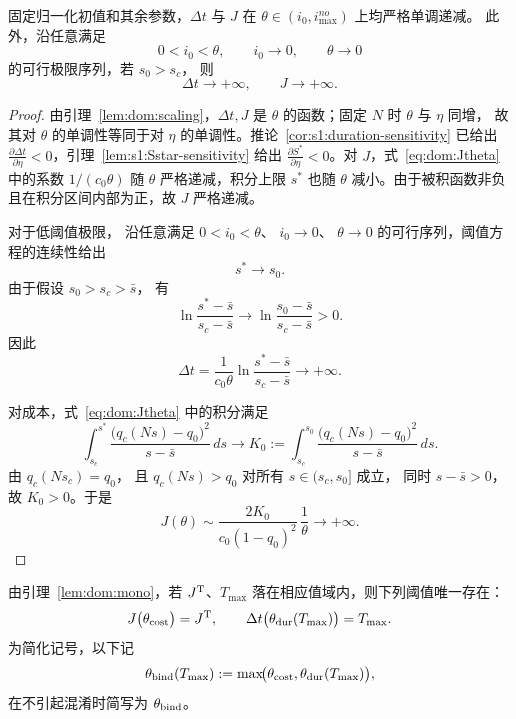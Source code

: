\documentclass[lang=cn,a4paper,newtx]{elegantpaper}
\numberwithin{equation}{section}
\theoremstyle{plain}
\begin{document}
\begin{lemma}\label{lem:dom:mono}
固定归一化初值和其余参数，$\Delta t$ 与 $J$ 在 $\theta\in(i_0,i_{\max}^{no})$ 上均严格单调递减。
此外，沿任意满足
\[
0<i_0<\theta,\qquad
i_0\to0,\qquad
\theta\to0
\]
的可行极限序列，若 $s_0>s_c$，
则
\[
\Delta t\to+\infty,
\qquad
J\to+\infty.
\]
\end{lemma}
\begin{proof}
由引理~\ref{lem:dom:scaling}，$\Delta t,J$ 是 $\theta$ 的函数；固定 $N$ 时 $\theta$ 与 $\eta$ 同增，
故其对 $\theta$ 的单调性等同于对 $\eta$ 的单调性。推论~\ref{cor:s1:duration-sensitivity} 已给出
$\frac{\partial \Delta t}{\partial \eta}<0$，引理~\ref{lem:s1:Sstar-sensitivity} 给出 $\frac{\partial S^\ast}{\partial \eta}<0$。对 $J$，式~\eqref{eq:dom:Jtheta} 中的系数 $1/(c_0\theta)$ 随 $\theta$ 严格递减，积分上限 $s^*$ 也随 $\theta$ 减小。由于被积函数非负且在积分区间内部为正，故 $J$ 严格递减。

对于低阈值极限，
沿任意满足
$0<i_0<\theta$、
$i_0\to0$、
$\theta\to0$
的可行序列，阈值方程的连续性给出
\[
  s^\ast\longrightarrow s_0.
\]
由于假设 $s_0>s_c>\bar s$，
有
\[
  \ln\frac{s^\ast-\bar s}{s_c-\bar s}
  \longrightarrow
  \ln\frac{s_0-\bar s}{s_c-\bar s}
  >0.
\]
因此
\[
  \Delta t
  =
  \frac{1}{c_0\theta}
  \ln\frac{s^\ast-\bar s}{s_c-\bar s}
  \longrightarrow+\infty.
\]

对成本，式~\eqref{eq:dom:Jtheta} 中的积分满足
\[
\int_{s_c}^{s^\ast}
\frac{\bigl(q_c(Ns)-q_0\bigr)^2}
     {s-\bar s}\,ds
\longrightarrow
K_0
:=
\int_{s_c}^{s_0}
\frac{\bigl(q_c(Ns)-q_0\bigr)^2}
     {s-\bar s}\,ds.
\]
由
$q_c(Ns_c)=q_0$，
且 $q_c(Ns)>q_0$ 对所有
$s\in(s_c,s_0]$ 成立，
同时 $s-\bar s>0$，
故 $K_0>0$。于是
\[
  J(\theta)
  \sim
  \frac{2K_0}
       {c_0(1-q_0)^2}\,
  \frac{1}{\theta}
  \longrightarrow+\infty.
\]
\end{proof}

由引理~\ref{lem:dom:mono}，若 $J^{\rm T}$、$T_{\max}$ 落在相应值域内，则下列阈值唯一存在：
\begin{equation}
  J\big(\theta_{\rm cost}\big)=J^{\rm T},\qquad
  \Delta t\big(\theta_{\rm dur}(T_{\max})\big)=T_{\max}.
  \label{eq:dom:thetadefs}
\end{equation}
为简化记号，以下记
\begin{equation}
  \theta_{\rm bind}(T_{\max})
  :=
  \max\!\bigl(
    \theta_{\rm cost},
    \theta_{\rm dur}(T_{\max})
  \bigr),
  \label{eq:dom:theta-bind}
\end{equation}
在不引起混淆时简写为 $\theta_{\rm bind}$。
\end{document}
